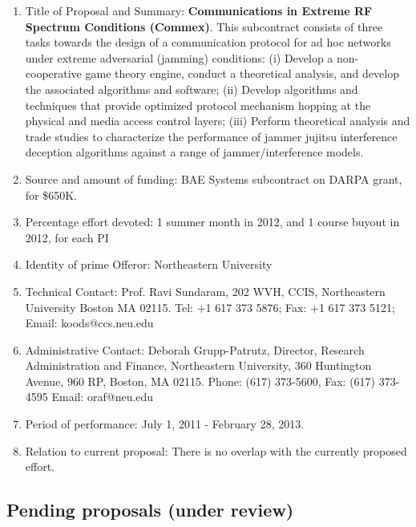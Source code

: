 \begin{enumerate}
\item Title of Proposal and Summary: {\bf Communications in Extreme RF
  Spectrum Conditions (Commex)}.  This subcontract consists of three
  tasks towards the design of a communication protocol for ad hoc
  networks under extreme adversarial (jamming) conditions: (i) Develop
  a non-cooperative game theory engine, conduct a theoretical
  analysis, and develop the associated algorithms and software; (ii)
  Develop algorithms and techniques that provide optimized protocol
  mechanism hopping at the physical and media access control layers;
  (iii) Perform theoretical analysis and trade studies to characterize
  the performance of jammer jujitsu interference deception algorithms
  against a range of jammer/interference models.
\item Source and amount of funding: BAE Systems subcontract on DARPA
  grant, for \$650K.
\item Percentage effort devoted: 1 summer month in 2012, and 1 course buyout in 2012, for each PI
\item Identity of prime Offeror: Northeastern University
\item Technical Contact: Prof. Ravi Sundaram,  202 WVH, CCIS, Northeastern University
Boston MA 02115.  Tel: +1 617 373 5876;  Fax: +1 617 373 5121;  Email: koods@ccs.neu.edu
\item Administrative Contact: Deborah Grupp-Patrutz, Director,
  Research Administration and Finance, Northeastern University, 360
  Huntington Avenue, 960 RP, Boston, MA 02115. Phone: (617) 373-5600,
  Fax: (617) 373-4595 Email: oraf@neu.edu
\item  Period of performance: July 1, 2011 - February 28, 2013.
\item Relation to current proposal: There is no overlap with the currently proposed effort.
\end{enumerate}

\subsection{Pending proposals (under review)}


